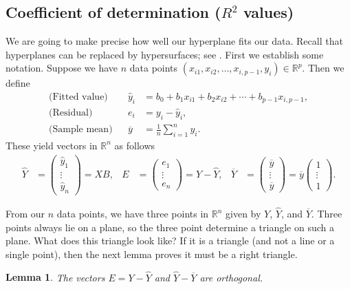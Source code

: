 \documentclass[a4paper, 12pt]{article}
\numberwithin{equation}{section}
\numberwithin{figure}{section}
\newtheorem{lem}[thm]{Lemma}
\theoremstyle{definition}
\newcommand{\R}{\mathbb{R}}
\begin{document}
\subsection{Coefficient of determination ($R^2$ values)}

We are going to make precise how well our hyperplane fits our data. Recall that
hyperplanes can be replaced by hypersurfaces; see .
First we establish some notation. Suppose we have $n$ data points $(x_{i1},
x_{i2}, \dots, x_{i,p-1}, y_i)\in \R^p$. Then we define  
\begin{align*}
	\text{(Fitted value)} & & \widehat{y}_i &= b_0 + b_1x_{i1} + b_2 x_{i2} + \cdots + b_{p-1} x_{i,p-1}, \\
	\text{(Residual)} & & e_i &= y_i - \widehat{y}_i, \\
	\text{(Sample mean)} & & \overline{y} &= \frac{1}{n}\sum_{i=1}^n y_i.
\end{align*}
These yield vectors in $\R^n$ as follows 
\begin{align*}
	\widehat{Y} &= \begin{pmatrix}
		\widehat{y}_1 \\ \vdots \\ \widehat{y}_n
	\end{pmatrix} = XB, & 
	E &= \begin{pmatrix}
		e_1 \\ \vdots \\ e_n
	\end{pmatrix} = Y - \widehat{Y}, & 
	\overline{Y} &= \begin{pmatrix}
		\overline{y} \\ \vdots \\ \overline{y}
	\end{pmatrix} = \overline{y} \begin{pmatrix}
		1 \\ \vdots \\ 1 
	\end{pmatrix}. 
\end{align*}

From our $n$ data points, we have three points in $\R^n$ given by $Y$,
$\widehat{Y}$, and $\overline{Y}$. Three points always lie on a plane, so the
three point determine a triangle on such a plane. What does this triangle look
like? If it is a triangle (and not a line or a single point), then the next
lemma proves it must be a right triangle.

\begin{lem}\label{lem:orthog}
	The vectors $E = Y - \widehat{Y}$ and $\widehat{Y}-\overline{Y}$ are
	orthogonal.
\end{lem}
\end{document}
